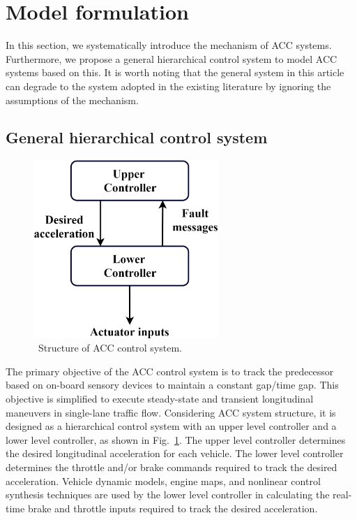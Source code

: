 \documentclass[a4paper]{cas-sc}
\begin{document}
\section{Model formulation}
\label{Section 2}
In this section, we systematically introduce the mechanism of ACC systems. Furthermore, we propose a general hierarchical control system to model ACC systems based on this. It is worth noting that the general system in this article can degrade to the system adopted in the existing literature by ignoring the assumptions of the mechanism.

\subsection{General hierarchical control system}
\label{Section 2.1}

\begin{figure}
  \centering
  \includegraphics[width=7cm]{figs/fig1.png}
  \caption{~Structure of ACC control system.}
  \label{fig1}
\end{figure}

The primary objective of the ACC control system is to track the predecessor based on on-board sensory devices to maintain a constant gap/time gap. This objective is simplified to execute steady-state and transient longitudinal maneuvers in single-lane traffic flow. Considering ACC system structure, it is designed as a hierarchical control system with an upper level controller and a lower level controller, as shown in Fig.~\ref{fig1}. The upper level controller determines the desired longitudinal acceleration for each vehicle. The lower level controller determines the throttle and/or brake commands required to track the desired acceleration. Vehicle dynamic models, engine maps, and nonlinear control synthesis techniques \citep{Choi1995,Choi1995a,Hedrick1991,Hedrick1993} are used by the lower level controller in calculating the real-time brake and throttle inputs required to track the desired acceleration.
\end{document}
